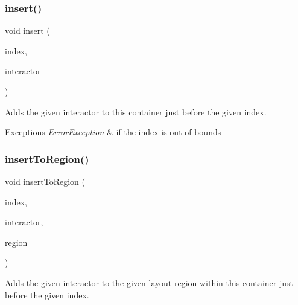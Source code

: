 \subsubsection{\texorpdfstring{insert()}{insert()}\hspace{0.1cm}{\footnotesize\ttfamily [2/2]}}
{\footnotesize\ttfamily void insert (\begin{DoxyParamCaption}\item[{int}]{index,  }\item[{\mbox{\hyperlink{classsgl_1_1GInteractor}{G\+Interactor}} \&}]{interactor }\end{DoxyParamCaption})\hspace{0.3cm}{\ttfamily [virtual]}}



Adds the given interactor to this container just before the given index. 


\begin{DoxyExceptions}{Exceptions}
{\em Error\+Exception} & if the index is out of bounds \\
\hline
\end{DoxyExceptions}
\mbox{\label{classsgl_1_1GContainer_a1c4b766b059991ad7d084ea03f22f1c5}} 
\subsubsection{\texorpdfstring{insert\+To\+Region()}{insertToRegion()}\hspace{0.1cm}{\footnotesize\ttfamily [1/4]}}
{\footnotesize\ttfamily void insert\+To\+Region (\begin{DoxyParamCaption}\item[{int}]{index,  }\item[{\mbox{\hyperlink{classsgl_1_1GInteractor}{G\+Interactor}} $\ast$}]{interactor,  }\item[{\mbox{\hyperlink{classsgl_1_1GContainer_a81a01a86de31071a92e6cce0bab9bc4b}{Region}}}]{region }\end{DoxyParamCaption})\hspace{0.3cm}{\ttfamily [virtual]}}



Adds the given interactor to the given layout region within this container just before the given index. 

